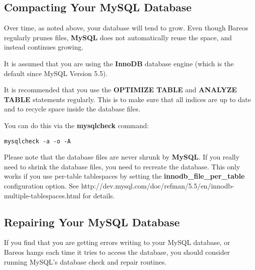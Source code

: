 \subsection{Compacting Your MySQL Database}
\label{CompactingMySQL}

Over time, as noted above, your database will tend to grow.
Even though Bareos regularly prunes files, {\bf MySQL} does not automatically
reuse the space, and instead continues growing.

It is assumed that you are using the {\bf InnoDB} database engine (which is the default since MySQL Version 5.5).

It is recommended that you use the {\bf OPTIMIZE TABLE} and {\bf ANALYZE TABLE}
statements regularly. This is to make sure that all indices are up to date
and to recycle space inside the database files.


You can do this via the {\bf mysqlcheck} command:
\footnotesize
\begin{verbatim}
mysqlcheck -a -o -A
\end{verbatim}
\normalsize

Please note that the database files are never shrunk by {\bf MySQL}. If you really need to shrink the database files, you need to recreate the database. This only works if you use per-table tablespaces by setting the {\bf innodb\_file\_per\_table} configuration option.
See
{http://dev.mysql.com/doc/refman/5.5/en/innodb-multiple-tablespaces.html} for details.


\subsection{Repairing Your MySQL Database}
\label{RepairingMySQL}

If you find that you are getting errors writing to your MySQL database, or
Bareos hangs each time it tries to access the database, you should consider
running MySQL's database check and repair routines.

